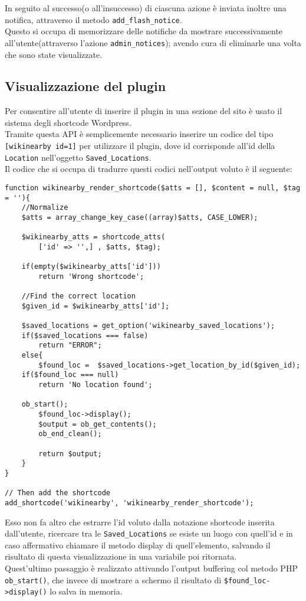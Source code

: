 In seguito al successo(o all'insuccesso) di ciascuna azione è inviata inoltre una notifica, attraverso il metodo \texttt{add\_flash\_notice}.\\
Questo si occupa di memorizzare delle notifiche da mostrare successivamente all'utente(attraverso l'azione \texttt{admin\_notices}\cite{notices}); avendo cura di eliminarle una volta che sono state visualizzate.
\subsection*{Visualizzazione del plugin}
Per consentire all'utente di inserire il plugin in una sezione del sito è usato il sistema degli shortcode Wordpress\cite{shortcode}.\\
Tramite questa API è semplicemente necessario inserire un codice del tipo \texttt{[wikinearby id=1]} per utilizzare il plugin, dove id corrisponde all'id della \texttt{Location} nell'oggetto \texttt{Saved\_Locations}.\\
Il codice che si occupa di tradurre questi codici nell'output voluto è il seguente:\\
\begin{lstlisting}
function wikinearby_render_shortcode($atts = [], $content = null, $tag = ''){
    //Normalize
    $atts = array_change_key_case((array)$atts, CASE_LOWER);

    $wikinearby_atts = shortcode_atts(
        ['id' => '',] , $atts, $tag);
    
    if(empty($wikinearby_atts['id']))
        return 'Wrong shortcode';

    //Find the correct location
    $given_id = $wikinearby_atts['id'];

    $saved_locations = get_option('wikinearby_saved_locations');
    if($saved_locations === false)
        return "ERROR";
    else{
        $found_loc =  $saved_locations->get_location_by_id($given_id);
	if($found_loc === null)
		return 'No location found';
		
	ob_start(); 
        $found_loc->display();
        $output = ob_get_contents();
        ob_end_clean();
        
        return $output;
    }
}

// Then add the shortcode
add_shortcode('wikinearby', 'wikinearby_render_shortcode');
\end{lstlisting}
Esso non fa altro che estrarre l'id voluto dalla notazione shortcode inserita dall'utente, ricercare tra le \texttt{Saved\_Locations} se esiste un luogo con quell'id e in caso affermativo chiamare il metodo display di quell'elemento, salvando il risultato di questa visualizzazione in una variabile poi ritornata.\\
Quest'ultimo passaggio è realizzato attivando l'output buffering col metodo PHP \texttt{ob\_start()}, che invece di mostrare a schermo il risultato di \texttt{\$found\_loc->display()} lo salva in memoria.